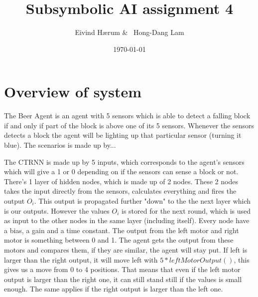 \documentclass[12pt, a4paper]{article}
\title{Subsymbolic AI assignment 4}
\author{Eivind Hærum \& \ Hong-Dang Lam}
\date{\today} %
\begin{document}
\maketitle
% 
% 
\newpage

\tableofcontents
{}
\newpage

\section{Overview of system}
The Beer Agent is an agent with 5 sensors which is able to detect a falling block if and only if part of the block is above one of its 5 sensors. Whenever the sensors detects a block the agent will be lighting up that particular sensor (turning it blue).
The scenarios is made up by...

The CTRNN is made up by 5 inputs, which corresponds to the agent's sensors which will give a 1 or 0 depending on if the sensors can sense a block or not. There's 1 layer of hidden nodes, which is made up of 2 nodes. These 2 nodes takes the input directly from the sensors, calculates everything and fires the output $ O_i $. This output is propagated further "down" to the the next layer which is our outputs. However the values $ O_i $ is stored for the next round, which is used as input to the other nodes in the same layer (including itself). Every node have a bias, a gain and a time constant.
The output from the left motor and right motor is something between 0 and 1. The agent gets the output from these motors and compares them, if they are similar, the agent will stay put. If left is larger than the right output, it will move left with $ 5*leftMotorOutput() $, this gives us a move from 0 to 4 positions. That means that even if the left motor output is larger than the right one, it can still stand still if the values is small enough. The same applies if the right output is larger than the left one.
\end{document}
